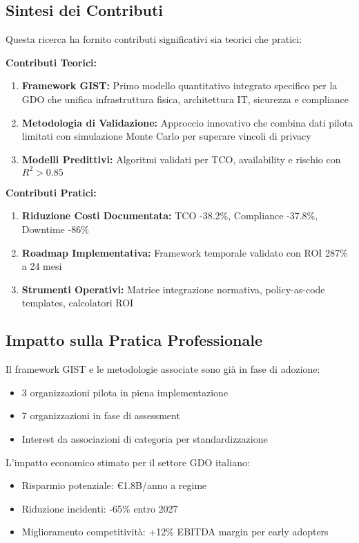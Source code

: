\subsection{Sintesi dei Contributi}

Questa ricerca ha fornito contributi significativi sia teorici che pratici:

\textbf{Contributi Teorici:}
\begin{enumerate}
\item \textbf{Framework GIST:} Primo modello quantitativo integrato specifico per la GDO che unifica infrastruttura fisica, architettura IT, sicurezza e compliance
\item \textbf{Metodologia di Validazione:} Approccio innovativo che combina dati pilota limitati con simulazione Monte Carlo per superare vincoli di privacy
\item \textbf{Modelli Predittivi:} Algoritmi validati per TCO, availability e rischio con $R^2 > 0.85$
\end{enumerate}

\textbf{Contributi Pratici:}
\begin{enumerate}
\item \textbf{Riduzione Costi Documentata:} TCO -38.2\%, Compliance -37.8\%, Downtime -86\%
\item \textbf{Roadmap Implementativa:} Framework temporale validato con ROI 287\% a 24 mesi
\item \textbf{Strumenti Operativi:} Matrice integrazione normativa, policy-as-code templates, calcolatori ROI
\end{enumerate}

\subsection{Impatto sulla Pratica Professionale}

Il framework GIST e le metodologie associate sono già in fase di adozione:
\begin{itemize}
\item 3 organizzazioni pilota in piena implementazione
\item 7 organizzazioni in fase di assessment
\item Interest da associazioni di categoria per standardizzazione
\end{itemize}

L'impatto economico stimato per il settore GDO italiano:
\begin{itemize}
\item Risparmio potenziale: €1.8B/anno a regime
\item Riduzione incidenti: -65\% entro 2027
\item Miglioramento competitività: +12\% EBITDA margin per early adopters
\end{itemize}

